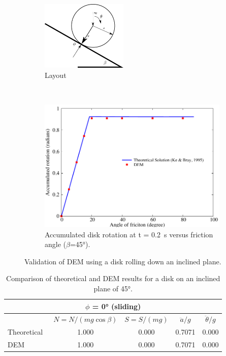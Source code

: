 \begin{figure}[tbhp]
\centering
\begin{subfigure}[b]{0.95\textwidth}
\centering
\includegraphics[width=0.45\textwidth]{rolling}
\caption{Layout}
\label{fig:rolling}
\end{subfigure}
\\
\begin{subfigure}[b]{0.95\textwidth}
\centering
\includegraphics[width=\textwidth]{DEM_Validation}
\caption{Accumulated disk rotation at t = 0.2~\si{\s} versus friction angle 
($\beta$=45\si{\degree}).}
\label{fig:DEM_Validation}
\end{subfigure}
\caption{Validation of DEM using a disk rolling down an inclined plane.}
\label{fig:Validation_DEM}
\end{figure}

\begin{table}[tbhp]
\caption{Comparison of theoretical and DEM results for a disk on an inclined 
plane of 45\si{\degree}.}
\label{table:dem_validation}
\centering
\begin{tabular}{lcccc}
\toprule
\multicolumn{5}{c}{$\phi$ = 0\si{\degree} (sliding)} \\ \midrule
 & $N=N/(mg\cos\beta)$ & $S=S/(mg)$ & $\ddot{a}/g$ & $\ddot{\theta}/g$\\
Theoretical~\citep{Ke1995} & 1.000 & 0.000 & 0.7071 & 0.000 \\
DEM & 1.000 & 0.000 & 0.7071 & 0.000 \\
\bottomrule
\end{tabular}
\end{table}

